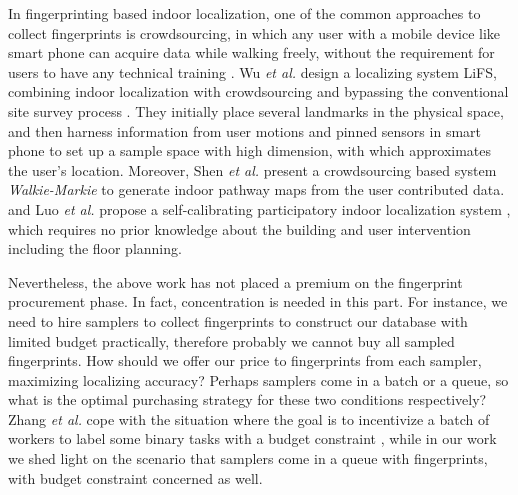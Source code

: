 \documentclass[10pt,conference,compsocconf,letterpaper]{IEEEtran}
\begin{document}
In fingerprinting based indoor localization, one of the common approaches to collect fingerprints is crowdsourcing, in which any user with a mobile device like smart phone can acquire data while walking freely, without the requirement for users to have any technical training \cite{}. Wu \emph{et al.} design a localizing system LiFS, combining indoor localization with crowdsourcing and bypassing the conventional site survey process \cite{yang2012locating,wu2015smartphones}. They initially place several landmarks in the physical space, and then harness information from user motions and pinned sensors in smart phone to set up a sample space with high dimension, with which approximates the user's location. %
Moreover, Shen \emph{et al.} present a crowdsourcing based system \emph{Walkie-Markie} \cite{walkie} to generate indoor pathway maps from the user contributed data. %
and Luo \emph{et al.} propose a self-calibrating participatory indoor localization system \cite{luo2014piloc}, which requires no prior knowledge about the building and user intervention including the floor planning. %

Nevertheless, the above work has not placed a premium on the fingerprint procurement phase. %
In fact, concentration is needed in this part. For instance, we need to hire samplers to collect fingerprints to construct our database with limited budget practically, therefore probably we cannot buy all sampled fingerprints. How should we offer our price to fingerprints from each sampler, maximizing localizing accuracy? Perhaps samplers come in a batch or a queue, so what is the optimal purchasing strategy for these two conditions respectively? Zhang \emph{et al.} cope with the situation where the goal is to incentivize a batch of workers to label some binary tasks with a budget constraint \cite{zhang2015incentivize}, while in our work we shed light on the scenario that samplers come in a queue with fingerprints, with budget constraint concerned as well.
\end{document}
